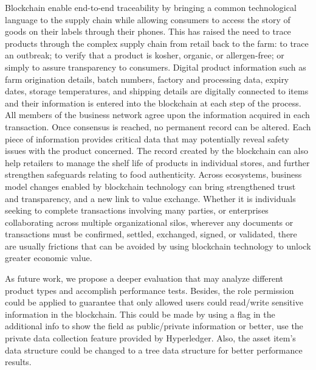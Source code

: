 Blockchain enable end-to-end traceability by bringing a common technological language to the supply chain while allowing consumers to access the story of goods on their labels through their phones. This has raised the need to trace products through the complex supply chain from retail back to the farm: to trace an outbreak; to verify that a product is kosher, organic, or allergen-free; or simply to assure transparency to consumers. Digital product information such as farm origination details, batch numbers, factory and processing data, expiry dates, storage temperatures, and shipping details are digitally connected to items and their information is entered into the blockchain at each step of the process. All members of the business network agree upon the information acquired in each transaction. Once consensus is reached, no permanent record can be altered. Each piece of information provides critical data that may potentially reveal safety issues with the product concerned. The record created by the blockchain can also help retailers to manage the shelf life of products in individual stores, and further strengthen safeguards relating to food authenticity. Across ecosystems, business model changes enabled by blockchain technology can bring strengthened trust and transparency, and a new link to value exchange. Whether it is individuals seeking to complete transactions involving many parties, or enterprises collaborating across multiple organizational silos, wherever any documents or transactions must be confirmed, settled, exchanged, signed, or validated, there are usually frictions that can be avoided by using blockchain technology to unlock greater economic value.

As future work, we propose a deeper evaluation that may analyze different product types and accomplish performance tests. Besides, the role permission could be applied to guarantee that only allowed users could read/write sensitive information in the blockchain. This could be made by using a flag in the additional info to show the field as public/private information or better, use the private data collection feature provided by Hyperledger. Also, the asset item's data structure could be changed to a tree data structure for better performance results. 